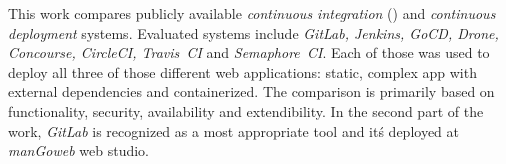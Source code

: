 This work compares publicly available \textit{continuous integration} (\CI) and \textit{continuous deployment} systems. Evaluated systems include \textit{GitLab, Jenkins, GoCD, Drone, Concourse, CircleCI, Travis~CI} and \textit{Semaphore~CI}. Each of those was used to deploy all three of those different web applications: static, complex app with external dependencies and containerized. The comparison is primarily based on functionality, security, availability and extendibility. In the second part of the work, \textit{GitLab} is recognized as a most appropriate tool and it\'s deployed at \textit{manGoweb} web studio.
